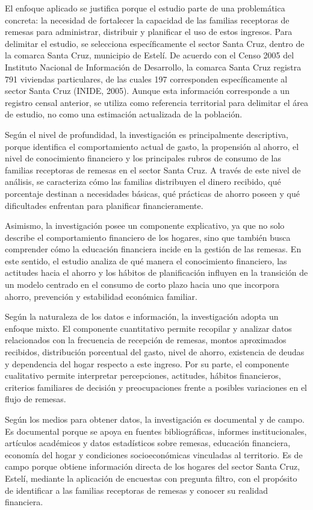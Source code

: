 \documentclass[12pt,letterpaper]{article}
\begin{document}
El enfoque aplicado se justifica porque el estudio parte de una problemática concreta: la necesidad de fortalecer la capacidad de las familias receptoras de remesas para administrar, distribuir y planificar el uso de estos ingresos. Para delimitar el estudio, se selecciona específicamente el sector Santa Cruz, dentro de la comarca Santa Cruz, municipio de Estelí. De acuerdo con el Censo 2005 del Instituto Nacional de Información de Desarrollo, la comarca Santa Cruz registra 791 viviendas particulares, de las cuales 197 corresponden específicamente al sector Santa Cruz (INIDE, 2005). Aunque esta información corresponde a un registro censal anterior, se utiliza como referencia territorial para delimitar el área de estudio, no como una estimación actualizada de la población.

Según el nivel de profundidad, la investigación es principalmente descriptiva, porque identifica el comportamiento actual de gasto, la propensión al ahorro, el nivel de conocimiento financiero y los principales rubros de consumo de las familias receptoras de remesas en el sector Santa Cruz. A través de este nivel de análisis, se caracteriza cómo las familias distribuyen el dinero recibido, qué porcentaje destinan a necesidades básicas, qué prácticas de ahorro poseen y qué dificultades enfrentan para planificar financieramente.

Asimismo, la investigación posee un componente explicativo, ya que no solo describe el comportamiento financiero de los hogares, sino que también busca comprender cómo la educación financiera incide en la gestión de las remesas. En este sentido, el estudio analiza de qué manera el conocimiento financiero, las actitudes hacia el ahorro y los hábitos de planificación influyen en la transición de un modelo centrado en el consumo de corto plazo hacia uno que incorpora ahorro, prevención y estabilidad económica familiar.

Según la naturaleza de los datos e información, la investigación adopta un enfoque mixto. El componente cuantitativo permite recopilar y analizar datos relacionados con la frecuencia de recepción de remesas, montos aproximados recibidos, distribución porcentual del gasto, nivel de ahorro, existencia de deudas y dependencia del hogar respecto a este ingreso. Por su parte, el componente cualitativo permite interpretar percepciones, actitudes, hábitos financieros, criterios familiares de decisión y preocupaciones frente a posibles variaciones en el flujo de remesas.

Según los medios para obtener datos, la investigación es documental y de campo. Es documental porque se apoya en fuentes bibliográficas, informes institucionales, artículos académicos y datos estadísticos sobre remesas, educación financiera, economía del hogar y condiciones socioeconómicas vinculadas al territorio. Es de campo porque obtiene información directa de los hogares del sector Santa Cruz, Estelí, mediante la aplicación de encuestas con pregunta filtro, con el propósito de identificar a las familias receptoras de remesas y conocer su realidad financiera.
\end{document}
